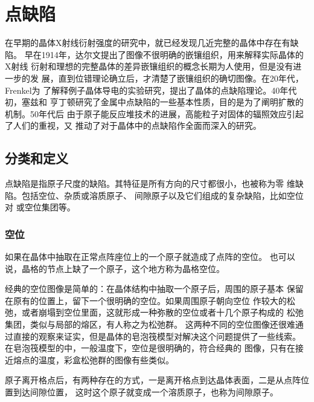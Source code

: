 \chapter{点缺陷}
    在早期的晶体X射线衍射强度的研究中，就已经发现几近完整的晶体中存在有缺陷。
    早在1914年，达尔文提出了图像不很明确的嵌镶组织，用来解释实际晶体的X射线
    衍射和理想的完整晶体的差异嵌镶组织的概念长期为人使用，但是没有进一步的发
    展，直到位错理论确立后，才清楚了嵌镶组织的确切图像。在20年代，Frenkel为
    了解释例子晶体导电的实验研究，提出了晶体的点缺陷理论。40年代初，塞兹和
    亨丁顿研究了金属中点缺陷的一些基本性质，目的是为了阐明扩散的机制。50年代后
    由于原子能反应堆技术的进展，高能粒子对固体的辐照效应引起了人们的重视，又
    推动了对于晶体中的点缺陷作全面而深入的研究。

    \section{分类和定义}
        点缺陷是指原子尺度的缺陷。其特征是所有方向的尺寸都很小，也被称为零
        维缺陷。包括空位、杂质或溶质原子、
        间隙原子以及它们组成的复杂缺陷，比如空位对
        或空位集团等。

        \subsection{空位}
            如果在晶体中抽取在正常点阵座位上的一个原子就造成了点阵的空位。
            也可以说，晶格的节点上缺了一个原子，这个地方称为晶格空位。

            经典的空位图像是简单的：在晶体结构中抽取一个原子后，周围的原子基本
            保留在原有的位置上，留下一个很明确的空位。如果周围原子朝向空位
            作较大的松弛，或者崩塌到空位里面，这就形成一种弥散的空位或者十几个原子构成的
            松弛集团，类似与局部的熔区，有人称之为松弛群。
            这两种不同的空位图像还很难通过直接的观察来证实，但是晶体的皂泡筏模型对解决这个问题提供了一些线索。
            在皂泡筏模型的\cite{book:1106816}中，一般温度下，空位是很明确的，符合经典的
            图像，只有在接近熔点的温度，彩盒松弛群的图像有些类似。

            原子离开格点后，有两种存在的方式，一是离开格点到达晶体表面，二是从点阵位置到达间隙位置，
            这时这个原子就变成一个溶质原子，也称为间隙原子。

